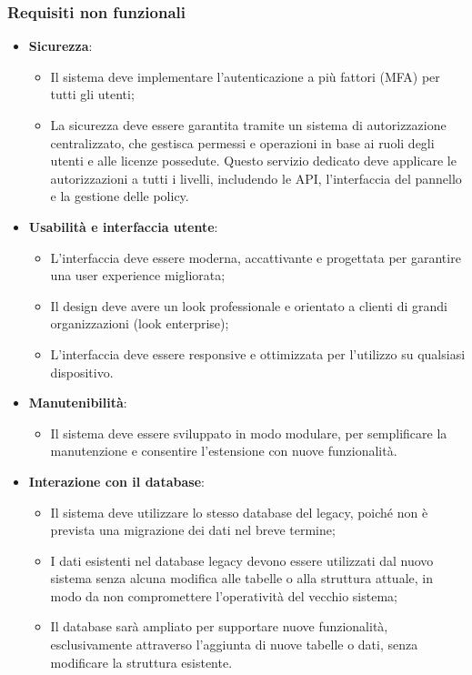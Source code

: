 \subsubsection{Requisiti non funzionali}
\begin{itemize}
  \item \textbf{Sicurezza}:
    \begin{itemize}
      \item Il sistema deve implementare l’autenticazione a più fattori (MFA) per tutti gli utenti;
      \item La sicurezza deve essere garantita tramite un sistema di autorizzazione centralizzato, che gestisca permessi e operazioni in base ai ruoli degli utenti e alle licenze possedute. Questo servizio dedicato deve applicare le autorizzazioni a tutti i livelli, includendo le API, l’interfaccia del pannello e la gestione delle policy.
    \end{itemize}

  \item \textbf{Usabilità e interfaccia utente}:
    \begin{itemize}
      \item L’interfaccia deve essere moderna, accattivante e progettata per garantire una user experience migliorata;
      \item Il design deve avere un look professionale e orientato a clienti di grandi organizzazioni (look enterprise);
      \item L’interfaccia deve essere responsive e ottimizzata per l’utilizzo su qualsiasi dispositivo.
    \end{itemize}

  \item \textbf{Manutenibilità}:
    \begin{itemize}
      \item Il sistema deve essere sviluppato in modo modulare, per semplificare la manutenzione e consentire l’estensione con nuove funzionalità.
    \end{itemize}

  \item \textbf{Interazione con il database}:
    \begin{itemize}
      \item Il sistema deve utilizzare lo stesso database del legacy, poiché non è prevista una migrazione dei dati nel breve termine;
      \item I dati esistenti nel database legacy devono essere utilizzati dal nuovo sistema senza alcuna modifica alle tabelle o alla struttura attuale, in modo da non compromettere l’operatività del vecchio sistema;
      \item Il database sarà ampliato per supportare nuove funzionalità, esclusivamente attraverso l’aggiunta di nuove tabelle o dati, senza modificare la struttura esistente.
    \end{itemize}
\end{itemize}
